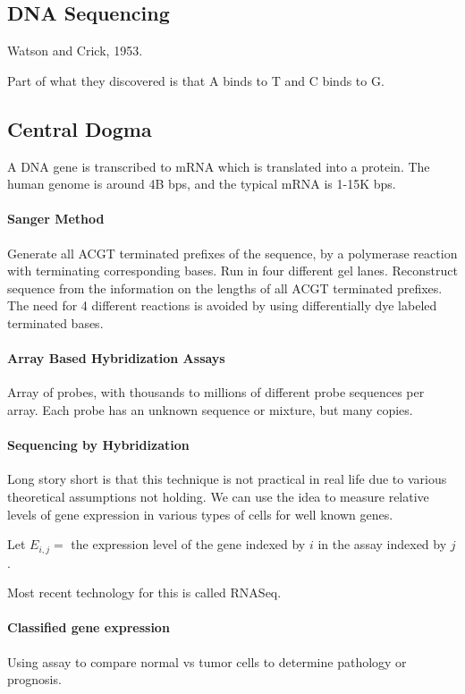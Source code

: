 \documentclass[a4paper]{article}
\begin{document}
\subsection{DNA Sequencing}
Watson and Crick, 1953.

Part of what they discovered is that A binds to T and C binds to G.

\subsection{Central Dogma}
A DNA gene is transcribed to mRNA which is translated into a protein.
The human genome is around 4B bps, and the typical mRNA is 1-15K bps.

\paragraph{Sanger Method}
Generate all ACGT terminated prefixes of the sequence, by a polymerase reaction with terminating corresponding bases.
Run in four different gel lanes.
Reconstruct sequence from the information on the lengths of all ACGT terminated prefixes.
The need for 4 different reactions is avoided by using differentially dye labeled terminated bases.

\paragraph{Array Based Hybridization Assays}
Array of probes, with thousands to millions of different probe sequences per array.
Each probe has an unknown sequence or mixture, but many copies.

\paragraph{Sequencing by Hybridization}
Long story short is that this technique is not practical in real life due to various theoretical assumptions not holding.
We can use the idea to measure relative levels of gene expression in various types of cells for well known genes.

Let $E_{i,j} = $ the expression level of the gene indexed by $i$ in the assay indexed by $j$.

Most recent technology for this is called RNASeq.

\paragraph{Classified gene expression}
Using assay to compare normal vs tumor cells to determine pathology or prognosis.
\end{document}
